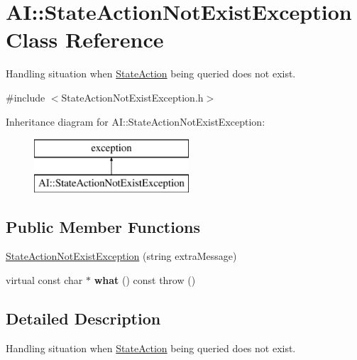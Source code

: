 \hypertarget{classAI_1_1StateActionNotExistException}{\section{A\+I\+:\+:State\+Action\+Not\+Exist\+Exception Class Reference}
\label{classAI_1_1StateActionNotExistException}
}


Handling situation when \hyperlink{classAI_1_1StateAction}{State\+Action} being queried does not exist.  




{\ttfamily \#include $<$State\+Action\+Not\+Exist\+Exception.\+h$>$}

Inheritance diagram for A\+I\+:\+:State\+Action\+Not\+Exist\+Exception\+:\begin{figure}[H]
\begin{center}
\leavevmode
\includegraphics[height=2.000000cm]{classAI_1_1StateActionNotExistException}
\end{center}
\end{figure}
\subsection*{Public Member Functions}
\begin{DoxyCompactItemize}
\item 
\hyperlink{classAI_1_1StateActionNotExistException_abcba2ae2e7a93a728595704c3440e778}{State\+Action\+Not\+Exist\+Exception} (string extra\+Message)
\item 
\hypertarget{classAI_1_1StateActionNotExistException_a787f165434d1a3d4d9c7e5f9a3fa302a}{virtual const char $\ast$ {\bfseries what} () const   throw ()}\label{classAI_1_1StateActionNotExistException_a787f165434d1a3d4d9c7e5f9a3fa302a}

\end{DoxyCompactItemize}


\subsection{Detailed Description}
Handling situation when \hyperlink{classAI_1_1StateAction}{State\+Action} being queried does not exist. 

